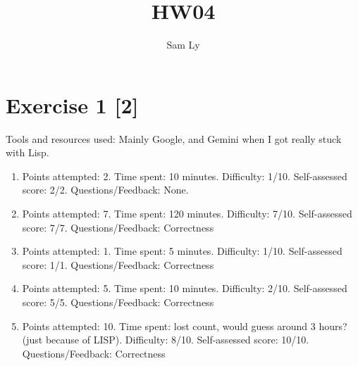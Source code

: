 \documentclass{article}
\title{HW04}
\author{Sam Ly}
\begin{document}
\maketitle

\section*{Exercise 1 [2]}
\noindent
Tools and resources used: Mainly Google, and Gemini when I got really stuck with Lisp.
\begin{enumerate}
  \item[Exercise 1]
    {\color{red} Points attempted: 2}.
    {\color{blue} Time spent: 10 minutes}.
    {\color{brown} Difficulty: 1/10}.
    {\color{green!50!black} Self-assessed score: 2/2}.
    {\color{magenta} Questions/Feedback: None.}
  \item[Exercise 2]
    {\color{red} Points attempted: 7}.
    {\color{blue} Time spent: 120 minutes}.
    {\color{brown} Difficulty: 7/10}.
    {\color{green!50!black} Self-assessed score: 7/7}.
    {\color{magenta} Questions/Feedback: Correctness}
  \item[Exercise 3]
    {\color{red} Points attempted: 1}.
    {\color{blue} Time spent: 5 minutes}.
    {\color{brown} Difficulty: 1/10}.
    {\color{green!50!black} Self-assessed score: 1/1}.
    {\color{magenta} Questions/Feedback: Correctness}
  \item[Choice Exercise 4]
    {\color{red} Points attempted: 5}.
    {\color{blue} Time spent: 10 minutes}.
    {\color{brown} Difficulty: 2/10}.
    {\color{green!50!black} Self-assessed score: 5/5}.
    {\color{magenta} Questions/Feedback: Correctness}
  \item[Choice Exercise 6]
    {\color{red} Points attempted: 10}.
    {\color{blue} Time spent: lost count, would guess around 3 hours? (just because of LISP)}.
    {\color{brown} Difficulty: 8/10}.
    {\color{green!50!black} Self-assessed score: 10/10}.
    {\color{magenta} Questions/Feedback: Correctness}
\end{enumerate}
\pagebreak
\end{document}
